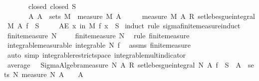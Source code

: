 \begin{isabellebody}
\ \ \ \ \ \ \ closed{\isacharcolon}{\kern0pt}\ {\isachardoublequoteopen}closed\ S{\isachardoublequoteclose}\isanewline
\ \ \ \ \ \ \ {\isachardoublequoteopen}{\isasymAnd}A{\isachardot}{\kern0pt}\ A\ {\isasymin}\ sets\ M\ {\isasymLongrightarrow}\ measure\ M\ A\ {\isachargreater}{\kern0pt}\ {}\ {\isasymLongrightarrow}\ {\isacharparenleft}{\kern0pt}{}\ {\isacharslash}{\kern0pt}\ measure\ M\ A{\isacharparenright}{\kern0pt}\ {\isacharasterisk}{\kern0pt}\isactrlsub R\ set{\isacharunderscore}{\kern0pt}lebesgue{\isacharunderscore}{\kern0pt}integral\ M\ A\ f\ {\isasymin}\ S{\isachardoublequoteclose}\isanewline
\ \ \ \ \ {\isachardoublequoteopen}AE\ x\ in\ M{\isachardot}{\kern0pt}\ f\ x\ {\isasymin}\ S{\isachardoublequoteclose}\isanewline
%
\isadelimproof
%
\endisadelimproof
%
\isatagproof
{}\isamarkupfalse%
\ {\isacharparenleft}{\kern0pt}induct\ rule{\isacharcolon}{\kern0pt}\ sigma{\isacharunderscore}{\kern0pt}finite{\isacharunderscore}{\kern0pt}measure{\isacharunderscore}{\kern0pt}induct{\isacharparenright}{\kern0pt}\isanewline
\ \ \isamarkupfalse%
\ {\isacharparenleft}{\kern0pt}finite{\isacharunderscore}{\kern0pt}measure\ N\ {\isasymOmega}{\isacharparenright}{\kern0pt}\isanewline
\isanewline
\ \ \isamarkupfalse%
\ finite{\isacharunderscore}{\kern0pt}measure\ N\ \isamarkupfalse%
\ {\isacharparenleft}{\kern0pt}rule\ finite{\isacharunderscore}{\kern0pt}measure{\isacharparenright}{\kern0pt}\isanewline
\ \ \isanewline
\ \ \isamarkupfalse%
\ integrable{\isacharbrackleft}{\kern0pt}measurable{\isacharbrackright}{\kern0pt}{\isacharcolon}{\kern0pt}\ {\isachardoublequoteopen}integrable\ N\ f{\isachardoublequoteclose}\ \isamarkupfalse%
\ assms\ finite{\isacharunderscore}{\kern0pt}measure\ \isamarkupfalse%
\ {\isacharparenleft}{\kern0pt}auto\ simp{\isacharcolon}{\kern0pt}\ integrable{\isacharunderscore}{\kern0pt}restrict{\isacharunderscore}{\kern0pt}space\ integrable{\isacharunderscore}{\kern0pt}mult{\isacharunderscore}{\kern0pt}indicator{\isacharparenright}{\kern0pt}\isanewline
\ \ \isamarkupfalse%
\ average{\isacharcolon}{\kern0pt}\ {\isachardoublequoteopen}{\isacharparenleft}{\kern0pt}{}\ {\isacharslash}{\kern0pt}\ Sigma{\isacharunderscore}{\kern0pt}Algebra{\isachardot}{\kern0pt}measure\ N\ A{\isacharparenright}{\kern0pt}\ {\isacharasterisk}{\kern0pt}\isactrlsub R\ set{\isacharunderscore}{\kern0pt}lebesgue{\isacharunderscore}{\kern0pt}integral\ N\ A\ f\ {\isasymin}\ S{\isachardoublequoteclose}\ \ {\isachardoublequoteopen}A\ {\isasymin}\ sets\ N{\isachardoublequoteclose}\ {\isachardoublequoteopen}measure\ N\ A\ {\isachargreater}{\kern0pt}\ {}{\isachardoublequoteclose}\ \ A\isanewline

\end{isabellebody}
